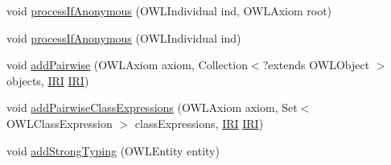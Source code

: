\begin{DoxyCompactItemize}
\item 
void \hyperlink{classorg_1_1coode_1_1owlapi_1_1rdf_1_1model_1_1_abstract_translator_3_01_n_o_d_e_00_01_r_e_s_o_ubc597564c2cb8c8d2b0139cb32f3f91c_a09078acf8dc45af6afc1a0d08f6994dc}{process\-If\-Anonymous} (O\-W\-L\-Individual ind, O\-W\-L\-Axiom root)
\item 
void \hyperlink{classorg_1_1coode_1_1owlapi_1_1rdf_1_1model_1_1_abstract_translator_3_01_n_o_d_e_00_01_r_e_s_o_ubc597564c2cb8c8d2b0139cb32f3f91c_ae00d8b98e19ca63152b2cb9807bc1849}{process\-If\-Anonymous} (O\-W\-L\-Individual ind)
\item 
void \hyperlink{classorg_1_1coode_1_1owlapi_1_1rdf_1_1model_1_1_abstract_translator_3_01_n_o_d_e_00_01_r_e_s_o_ubc597564c2cb8c8d2b0139cb32f3f91c_a7c2a4a6dbaba2f394cfdc23d9bdea62e}{add\-Pairwise} (O\-W\-L\-Axiom axiom, Collection$<$?extends O\-W\-L\-Object $>$ objects, \hyperlink{classorg_1_1semanticweb_1_1owlapi_1_1model_1_1_i_r_i}{I\-R\-I} \hyperlink{classorg_1_1semanticweb_1_1owlapi_1_1model_1_1_i_r_i}{I\-R\-I})
\item 
void \hyperlink{classorg_1_1coode_1_1owlapi_1_1rdf_1_1model_1_1_abstract_translator_3_01_n_o_d_e_00_01_r_e_s_o_ubc597564c2cb8c8d2b0139cb32f3f91c_ab3c9f86a9c855df45bfedc40b924aeb5}{add\-Pairwise\-Class\-Expressions} (O\-W\-L\-Axiom axiom, Set$<$ O\-W\-L\-Class\-Expression $>$ class\-Expressions, \hyperlink{classorg_1_1semanticweb_1_1owlapi_1_1model_1_1_i_r_i}{I\-R\-I} \hyperlink{classorg_1_1semanticweb_1_1owlapi_1_1model_1_1_i_r_i}{I\-R\-I})
\item 
void \hyperlink{classorg_1_1coode_1_1owlapi_1_1rdf_1_1model_1_1_abstract_translator_3_01_n_o_d_e_00_01_r_e_s_o_ubc597564c2cb8c8d2b0139cb32f3f91c_a212ec683d19a8dcb9c86c5aea10a6900}{add\-Strong\-Typing} (O\-W\-L\-Entity entity)
\end{DoxyCompactItemize}
